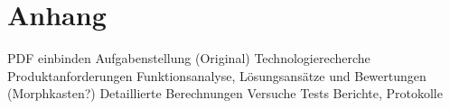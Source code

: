 


\section{Anhang}
 




PDF einbinden
Aufgabenstellung (Original)
Technologierecherche
Produktanforderungen
Funktionsanalyse, Lösungsansätze und Bewertungen (Morphkasten?)
Detaillierte Berechnungen
Versuche Tests
Berichte, Protokolle


